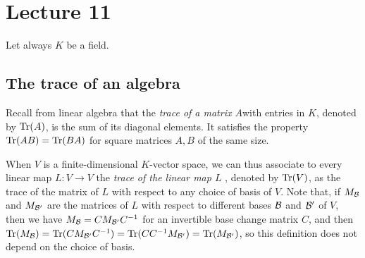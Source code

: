 \documentclass[12pt, leqno, british]{amsart}
\author{Nicolas Daans}
\begin{document}
\section{Lecture 11}
Let always $K$ be a field.

\subsection{The trace of an algebra}
Recall from linear algebra that the \emph{trace of a matrix $A$}with entries in $K$, denoted by $\operatorname{Tr}(A)$, is the sum of its diagonal elements.
It satisfies the property $\operatorname{Tr}(AB) = \operatorname{Tr}(BA)$ for square matrices $A, B$ of the same size.

When $V$ is a finite-dimensional $K$-vector space, we can thus associate to every linear map $L : V \to V$ the \emph{trace of the linear map $L$} , denoted by $\operatorname{Tr}(V)$, as the trace of the matrix of $L$ with respect to any choice of basis of $V$.
Note that, if $M_{\mathcal{B}}$ and $M_{\mathcal{B}'}$ are the matrices of $L$ with respect to different bases $\mathcal{B}$ and $\mathcal{B}'$ of $V$, then we have $M_{\mathcal{B}} = CM_{\mathcal{B}'}C^{-1}$ for an invertible base change matrix $C$, and then $\operatorname{Tr}(M_{\mathcal{B}}) = \operatorname{Tr}(CM_{\mathcal{B}'}C^{-1}) = \operatorname{Tr}(CC^{-1}M_{\mathcal{B}'}) = \operatorname{Tr}(M_{\mathcal{B}'})$, so this definition does not depend on the choice of basis.
\end{document}
